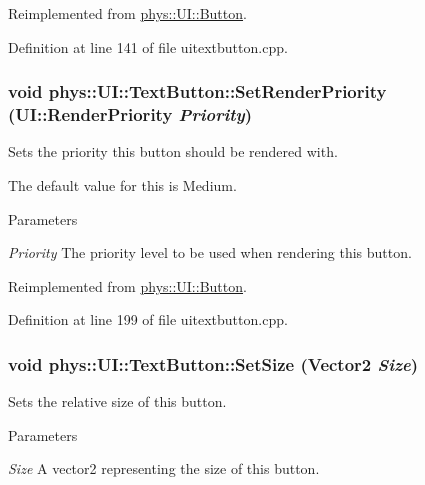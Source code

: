 Reimplemented from \hyperlink{classphys_1_1UI_1_1Button_aadb9b867ceccad8313591ae5e434274d}{phys::UI::Button}.



Definition at line 141 of file uitextbutton.cpp.

\hypertarget{classphys_1_1UI_1_1TextButton_a7d4e22acd792b10f2f7986d8f449ec16}{
\subsubsection[{SetRenderPriority}]{\setlength{\rightskip}{0pt plus 5cm}void phys::UI::TextButton::SetRenderPriority (UI::RenderPriority {\em Priority})}}
\label{df/d03/classphys_1_1UI_1_1TextButton_a7d4e22acd792b10f2f7986d8f449ec16}


Sets the priority this button should be rendered with. 

The default value for this is Medium. 
\begin{DoxyParams}{Parameters}
\item[{\em Priority}]The priority level to be used when rendering this button. \end{DoxyParams}


Reimplemented from \hyperlink{classphys_1_1UI_1_1Button_a569053caa70448d560fd016d86ef52cb}{phys::UI::Button}.



Definition at line 199 of file uitextbutton.cpp.

\hypertarget{classphys_1_1UI_1_1TextButton_a04a27287b038220fa8183079c1a727ec}{
\subsubsection[{SetSize}]{\setlength{\rightskip}{0pt plus 5cm}void phys::UI::TextButton::SetSize ({\bf Vector2} {\em Size})}}
\label{df/d03/classphys_1_1UI_1_1TextButton_a04a27287b038220fa8183079c1a727ec}


Sets the relative size of this button. 


\begin{DoxyParams}{Parameters}
\item[{\em Size}]A vector2 representing the size of this button. \end{DoxyParams}


